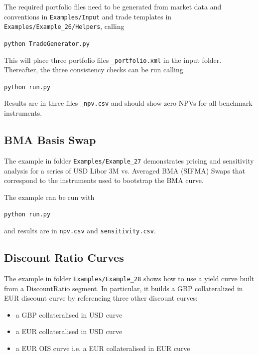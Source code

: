 \medskip
The required portfolio files need to be generated from market data and conventions in
{\tt Examples/Input} and trade templates in
{\tt Examples/Example\_26/Helpers}, calling

\medskip
\centerline{\tt python TradeGenerator.py}

\medskip
This will place three portfolio files {\tt *\_portfolio.xml} in the input folder.
Thereafter, the three consistency checks can be run calling

\medskip
\centerline{\tt python run.py}

\medskip
Results are in three files {\tt *\_npv.csv} and should show zero NPVs for all benchmark instruments.

\subsection{BMA Basis Swap}%
\label{example:27}

The example in folder {\tt Examples/Example\_27} demonstrates pricing
and sensitivity analysis for a series of USD Libor 3M vs. Averaged BMA (SIFMA)
Swaps that correspond to the instruments used to bootstrap the BMA curve.

The example can be run with

\medskip
\centerline{\tt python run.py}

\medskip
and results are in {\tt npv.csv} and {\tt sensitivity.csv}.

\subsection{Discount Ratio Curves}%
\label{example:28}

The example in folder {\tt Examples/Example\_28} shows how to use a yield curve
built from a DiscountRatio segment.
In particular, it builds a GBP collateralized in EUR discount curve by referencing
three other discount curves:
\begin{itemize}
\item a GBP collateralised in USD curve
\item a EUR collateralised in USD curve
\item a EUR OIS curve i.e. a EUR collateralised in EUR curve
\end{itemize}

